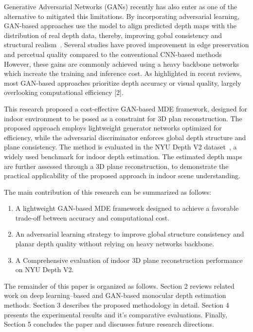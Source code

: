 \documentclass[journal,article,submit,pdftex,moreauthors]{Definitions/mdpi}
\begin{document}
Generative Adversarial Networks (GANs) recently has also enter as one of the alternative to mitigated this limitations. 
By incorporating adversarial learning, GAN-based approaches use the model to align predicted depth maps with the distribution of real depth data, thereby, improving gobal consistency and structural realism~\cite{Chen2019GANDepth,Isola2017Pix2Pix,Khan2023GANDepth}.
Several studies have proved improvement in edge preservation and percetual quality compared to the conventional CNN-based methods
However, these gains are commonly achieved using a heavy backbone networks which increate the training and inference cost.
As highlighted in recent reviews, most GAN-based approaches prioritize depth accuracy or visual quality, largely overlooking computational efficiency [2].

This research proposed a cost-effective GAN-based MDE framework, designed for indoor environment to be posed as a constraint for 3D plan reconstruction.
The proposed approach employs lightweight generator networks optimized for efficiency, while the adversarial discriminator enforces global depth structure and plane consistency.
The method is evaluated in the NYU Depth V2 dataset~\cite{Silberman2012NYU}, a widely used benchmark for indoor depth estimation.
The estimated depth maps are further assessed through a 3D plane reconstruction, to demonstrate the practical applicability of the proposed approach in indoor scene understanding.

The main contribution of this research can be summarized as follows:
\begin{enumerate}
    \item A lightweight GAN-based MDE framework designed to achieve a favorable trade-off between accuracy and computational cost.
    \item An adversarial learning strategy to improve global structure consistency and planar depth quality without relying on heavy networks backbone.
    \item A Comprehensive evaluation of indoor 3D plane reconstruction performance on NYU Depth V2.
\end{enumerate}

The remainder of this paper is organized as follows. Section 2 reviews related work on deep learning–based and GAN-based monocular depth estimation methods. 
Section 3 describes the proposed methodology in detail. Section 4 presents the experimental results and it's comparative evaluations. 
Finally, Section 5 concludes the paper and discusses future research directions.
\end{document}
